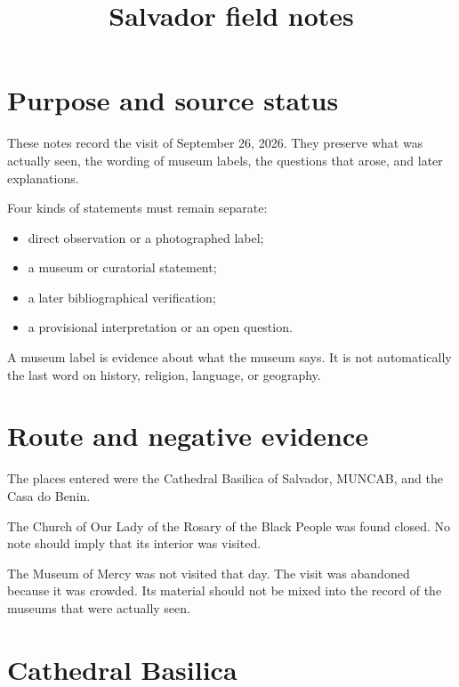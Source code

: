 



\title{Salvador field notes}
\maketitle

\label{section-salvador-fieldnotes}

\tableofcontents

\section{Purpose and source status}

These notes record the visit of
September 26, 2026.  They preserve
what was actually seen, the wording of
museum labels, the questions that arose,
and later explanations.

Four kinds of statements must remain
separate:

\begin{itemize}
\item direct observation or a photographed
label;
\item a museum or curatorial statement;
\item a later bibliographical verification;
\item a provisional interpretation or an
open question.
\end{itemize}

A museum label is evidence about what the
museum says.  It is not automatically the
last word on history, religion, language,
or geography.

\section{Route and negative evidence}

The places entered were the Cathedral
Basilica of Salvador, MUNCAB, and the
Casa do Benin.

The Church of Our Lady of the Rosary of
the Black People was found closed.  No
note should imply that its interior was
visited.

The Museum of Mercy was not visited that
day.  The visit was abandoned because it
was crowded.  Its material should not be
mixed into the record of the museums that
were actually seen.

\section{Cathedral Basilica}

